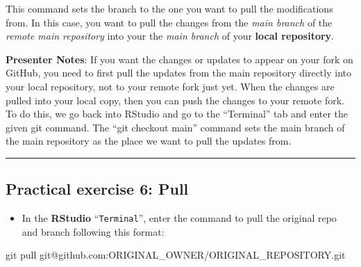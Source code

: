 \documentclass[
  letterpaper,
  DIV=11,
  numbers=noendperiod]{scrartcl}
\newenvironment{Shaded}{\begin{snugshade}}{\end{snugshade}}
\newcommand{\NormalTok}[1]{\textcolor[rgb]{0.00,0.23,0.31}{#1}}
\providecommand{\tightlist}{%
  \setlength{\itemsep}{0pt}\setlength{\parskip}{0pt}}
\begin{document}
\begin{tcolorbox}[enhanced jigsaw, colbacktitle=quarto-callout-note-color!10!white, opacityback=0, leftrule=.75mm, colback=white, opacitybacktitle=0.6, colframe=quarto-callout-note-color-frame, title=\textcolor{quarto-callout-note-color}{\faInfo}\hspace{0.5em}{\texttt{git\ checkout}}, left=2mm, titlerule=0mm, toptitle=1mm, breakable, bottomtitle=1mm, arc=.35mm, rightrule=.15mm, bottomrule=.15mm, toprule=.15mm, coltitle=black]

This command sets the branch to the one you want to pull the
modifications from. In this case, you want to pull the changes from the
\emph{main branch} of the \emph{remote main repository} into your the
\emph{main branch} of your \textbf{local repository}.

\end{tcolorbox}

\textbf{Presenter Notes}: If you want the changes or updates to appear
on your fork on GitHub, you need to first pull the updates from the main
repository directly into your local repository, not to your remote fork
just yet. When the changes are pulled into your local copy, then you can
push the changes to your remote fork. To do this, we go back into
RStudio and go to the ``Terminal'' tab and enter the given git command.
The ``git checkout main'' command sets the main branch of the main
repository as the place we want to pull the updates from.

\begin{center}\rule{0.5\linewidth}{0.5pt}\end{center}

\subsection{Practical exercise 6:
Pull}\label{practical-exercise-6-pull-1}

\begin{itemize}
\tightlist
\item[$\square$]
  In the \textbf{RStudio} ``\texttt{Terminal}'', enter the command to
  pull the original repo and branch following this format:
\end{itemize}

\begin{Shaded}
\begin{Highlighting}[]
\NormalTok{git pull git@github.com:ORIGINAL\_OWNER/ORIGINAL\_REPOSITORY.git}
\end{Highlighting}
\end{Shaded}
\end{document}
